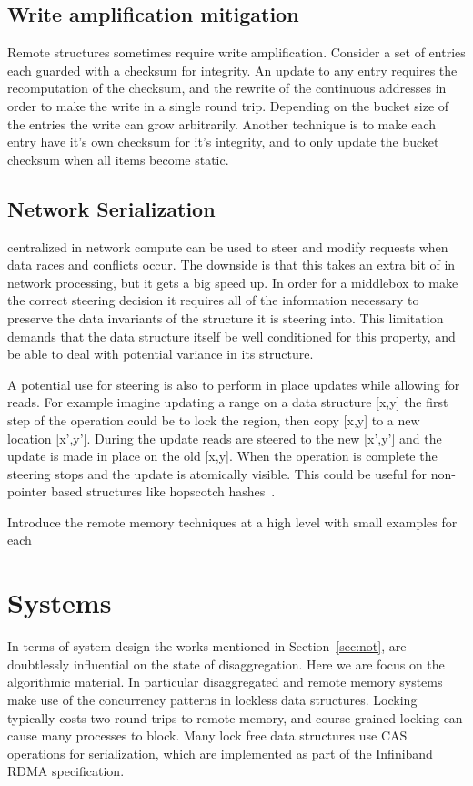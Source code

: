 \subsection{Write amplification mitigation}
\label{sec:write-amplification}
Remote structures sometimes require write
amplification. Consider a set of entries each guarded with a checksum for
integrity. An update to any entry requires the recomputation of the checksum,
and the rewrite of the continuous addresses in order to make the write in a
single round trip. Depending on the bucket size of the entries the write can
grow arbitrarily. Another technique is to make each entry have it's own checksum
for it's integrity, and to only update the bucket checksum when all items become
static.

\subsection{Network Serialization} 
\label{sec:net_ser}
%
centralized in network compute can be used to steer and modify
requests when data races and conflicts occur. The downside is that this takes an
extra bit of in network processing, but it gets a big speed up. In order for a
middlebox to make the correct steering decision it requires all of the
information necessary to preserve the data invariants of the structure it is
steering into. This limitation demands that the data structure itself be well
conditioned for this property, and be able to deal with potential variance in
its structure.

A potential use for steering is also to perform in place updates while allowing
for reads. For example imagine updating a range on a data structure [x,y] the
first step of the operation could be to lock the region, then copy [x,y] to a
new location [x',y']. During the update reads are steered to the new [x',y'] and
the update is made in place on the old [x,y]. When the operation is complete the
steering stops and the update is atomically visible. This could be useful for
non-pointer based structures like hopscotch hashes~\cite{hopscotch}.


Introduce the remote memory techniques at a high level with small examples for each

\section{Systems}
In terms of system design the works mentioned in Section~\ref{sec:not}, are
doubtlessly influential on the state of disaggregation. Here we are focus on the
algorithmic material. In particular disaggregated and remote memory systems make
use of the concurrency patterns in lockless data structures. Locking typically
costs two round trips to remote memory, and course grained locking can cause
many processes to block. Many lock free data structures use CAS operations for
serialization, which are implemented as part of the Infiniband RDMA
specification.

